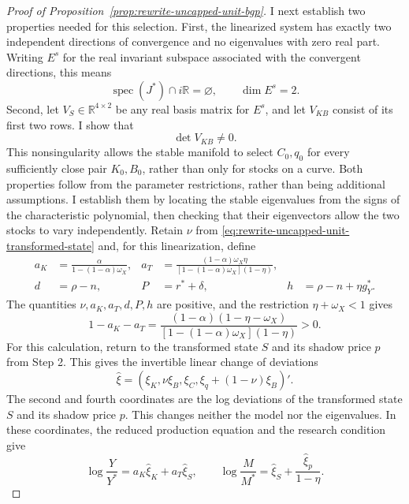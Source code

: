 \begin{proof}[Proof of Proposition~\ref{prop:rewrite-uncapped-unit-bgp}]
I next establish two properties needed for this selection. First, the
linearized system has exactly two independent directions of convergence
and no eigenvalues with zero real part. Writing $E^s$ for the real
invariant subspace associated with the convergent directions, this means
\begin{equation}
 \operatorname{spec}(J^*)\cap i\mathbb R=\varnothing,
 \qquad \dim E^s=2.
 \label{eq:rewrite-uncapped-unit-local-spectrum}
\end{equation}
Second, let $V_S\in\mathbb R^{4\times2}$ be any real basis matrix for
$E^s$, and let $V_{KB}$ consist of its first two rows. I show that
\begin{equation}
 \det V_{KB}\ne0.
 \label{eq:rewrite-uncapped-unit-local-projection}
\end{equation}
This nonsingularity allows the stable manifold to select $C_0,q_0$ for
every sufficiently close pair $K_0,B_0$, rather than only for stocks on a
curve. Both properties follow from the parameter restrictions, rather
than being additional assumptions. I establish them by locating the
stable eigenvalues from the signs of the characteristic polynomial,
then checking that their eigenvectors allow the two stocks to vary
independently. Retain $\nu$ from
\eqref{eq:rewrite-uncapped-unit-transformed-state} and, for this linearization,
define
\begin{align*}
 a_K&=\frac{\alpha}{1-(1-\alpha)\omega_X},&
 a_T&=\frac{(1-\alpha)\omega_X\eta}
 {[1-(1-\alpha)\omega_X](1-\eta)},\\
 d&=\rho-n,&P&=r^*+\delta,&h&=\rho-n+\eta g_Y^*.
\end{align*}
The quantities $\nu,a_K,a_T,d,P,h$ are positive, and the restriction
$\eta+\omega_X<1$ gives
\begin{equation}
 1-a_K-a_T
 =\frac{(1-\alpha)(1-\eta-\omega_X)}
 {[1-(1-\alpha)\omega_X](1-\eta)}>0.
 \label{eq:rewrite-uncapped-unit-local-gap}
\end{equation}
For this calculation, return to the transformed state $S$ and its shadow
price $p$ from Step 2. This gives the invertible linear change of deviations
\[
 \widehat\xi=(\xi_K,\nu\xi_B,\xi_C,\xi_q+(1-\nu)\xi_B)'.
\]
The second and fourth coordinates are the log deviations of the transformed
state $S$ and its shadow price $p$. This changes neither the model nor the
eigenvalues. In these coordinates, the reduced production equation and
the research condition give
\[
 \log\frac Y{Y^*}=a_K\widehat\xi_K+a_T\widehat\xi_S,\qquad
 \log\frac M{M^*}=\widehat\xi_S+\frac{\widehat\xi_p}{1-\eta}.
\]
\end{proof}
